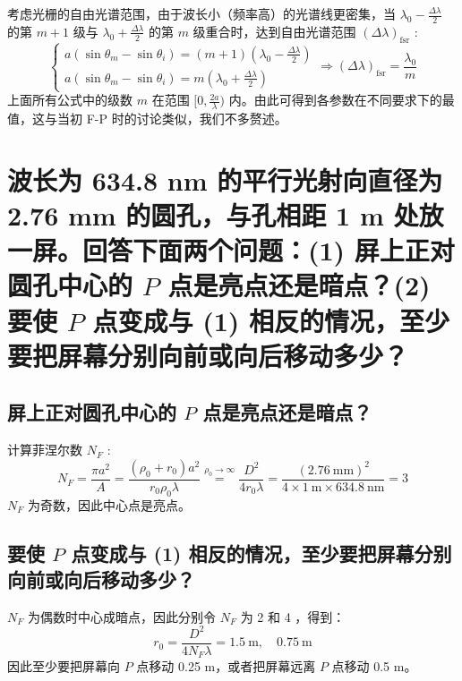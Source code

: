 \documentclass[UTF8]{report}
\theoremstyle{MyLineTheoremStyle} %
\theoremstyle{MyBlockTheoremStyle} %
\theoremstyle{MySubsubsectionStyle} %
\begin{document}
考虑光栅的自由光谱范围，由于波长小（频率高）的光谱线更密集，当 $\lambda_0 - \frac{\Delta \lambda}{2}$ 的第 $m+1$ 级与 $\lambda_0 + \frac{\Delta \lambda}{2}$ 的第 $m$ 级重合时，达到自由光谱范围 $\left(\Delta \lambda\right)_{\text{fsr}}$ :
\begin{equation}
\begin{cases}
    a(\sin \theta_m - \sin \theta_i ) = (m+1)\left(\lambda_0 - \frac{\Delta \lambda}{2}\right) \\ 
    a(\sin \theta_m - \sin \theta_i ) = m\left(\lambda_0 + \frac{\Delta \lambda}{2}\right)
\end{cases}
\Longrightarrow 
\left(\Delta \lambda\right)_{\text{fsr}} = \frac{\lambda_0}{m}
\end{equation}
上面所有公式中的级数 $m$ 在范围 $[0, \frac{2a}{\lambda})$ 内。由此可得到各参数在不同要求下的最值，这与当初 F-P 时的讨论类似，我们不多赘述。


\section{波长为 634.8 nm 的平行光射向直径为 2.76 mm 的圆孔，与孔相距 1 m 处放一屏。回答下面两个问题：(1) 屏上正对圆孔中心的 $P$ 点是亮点还是暗点？(2) 要使 $P$ 点变成与 (1) 相反的情况，至少要把屏幕分别向前或向后移动多少？}

\subsection{屏上正对圆孔中心的 $P$ 点是亮点还是暗点？}

计算菲涅尔数 $N_F$ : 
\begin{equation}
N_F = \frac{\pi a^2}{A} = \frac{(\rho_0 + r_0) a^2}{r_0 \rho_0 \lambda} \overset{\rho_0 \to \infty}{=} \frac{D^2}{4 r_0 \lambda} = \frac{(2.76 \ \mathrm{mm})^2}{4 \times 1 \ \mathrm{m} \times 634.8 \ \mathrm{nm}} = 3
\end{equation}
$N_F$ 为奇数，因此中心点是亮点。

\subsection{要使 $P$ 点变成与 (1) 相反的情况，至少要把屏幕分别向前或向后移动多少？}

$N_F$ 为偶数时中心成暗点，因此分别令 $N_F$ 为 2 和 4 ，得到：
\begin{equation}
r_0 = \frac{D^2}{4 N_F \lambda} = 1.5 \ \mathrm{m},\quad 0.75 \ \mathrm{m}
\end{equation}
因此至少要把屏幕向 $P$ 点移动 0.25 m，或者把屏幕远离 $P$ 点移动 0.5 m。
\end{document}

